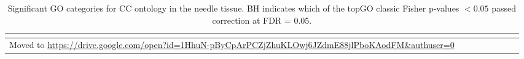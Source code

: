 \begin{longtable}{llllrlrr}
\caption{Significant GO categories for CC ontology in the needle tissue. BH indicates which of the topGO classic Fisher p-values $< 0.05$ passed correction at FDR = 0.05.}\\
\label{tab:go-needle-CC}\\
\toprule
    Moved to \scriptsize{\url{https://drive.google.com/open?id=1HhuN-pByCpArPCZjZhuKLOwj6JZdmE88jlPboKAodFM&authuser=0}} \\
    \bottomrule
\end{longtable}
